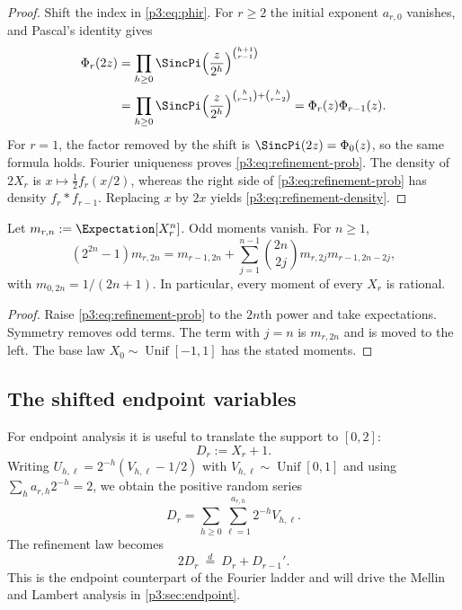 \documentclass[11pt,oneside]{article}
\theoremstyle{definition}
\theoremstyle{remark}
\begin{document}
\begin{proof}
Shift the index in \eqref{p3:eq:phir}.  For $r\ge2$ the initial exponent $a_{r,0}$ vanishes, and Pascal's identity gives
\begin{align*}
 \Phi_r(2z)
 &=\prod_{h\ge0}\SincPi\!\left(\frac z{2^h}\right)^{\binom{h+1}{r-1}}\\
 &=\prod_{h\ge0}\SincPi\!\left(\frac z{2^h}\right)^{\binom h{r-1}+\binom h{r-2}}
 =\Phi_r(z)\Phi_{r-1}(z).
\end{align*}
For $r=1$, the factor removed by the shift is $\SincPi(2z)=\Phi_0(z)$, so the same formula holds.  Fourier uniqueness proves \eqref{p3:eq:refinement-prob}.  The density of $2X_r$ is $x\mapsto \frac12 f_r(x/2)$, whereas the right side of \eqref{p3:eq:refinement-prob} has density $f_r*f_{r-1}$.  Replacing $x$ by $2x$ yields \eqref{p3:eq:refinement-density}.
\end{proof}

\begin{corollary}\label{p3:cor:moment-ladder}
Let $m_{r,n}:=\Expectation[X_r^n]$.  Odd moments vanish.  For $n\ge1$,
\begin{equation}\label{p3:eq:moment-ladder}
 (2^{2n}-1)m_{r,2n}
 =m_{r-1,2n}
 +\sum_{j=1}^{n-1}\binom{2n}{2j}m_{r,2j}m_{r-1,2n-2j},
\end{equation}
with $m_{0,2n}=1/(2n+1)$.  In particular, every moment of every $X_r$ is rational.
\end{corollary}

\begin{proof}
Raise \eqref{p3:eq:refinement-prob} to the $2n$th power and take expectations.  Symmetry removes odd terms.  The term with $j=n$ is $m_{r,2n}$ and is moved to the left.  The base law $X_0\sim\operatorname{Unif}[-1,1]$ has the stated moments.
\end{proof}

\subsection{The shifted endpoint variables}

For endpoint analysis it is useful to translate the support to $[0,2]$:
\begin{equation}\label{p3:eq:Dr}
  D_r:=X_r+1.
\end{equation}
Writing $U_{h,\ell}=2^{-h}(V_{h,\ell}-1/2)$ with $V_{h,\ell}\sim\operatorname{Unif}[0,1]$ and using $\sum_h a_{r,h}2^{-h}=2$, we obtain the positive random series
\begin{equation}\label{p3:eq:Dr-series}
  D_r=\sum_{h\ge0}\sum_{\ell=1}^{a_{r,h}}2^{-h}V_{h,\ell}.
\end{equation}
The refinement law becomes
\begin{equation}\label{p3:eq:Dr-refine}
  2D_r\ \stackrel d=\ D_r+D_{r-1}'.
\end{equation}
This is the endpoint counterpart of the Fourier ladder and will drive the Mellin and Lambert analysis in \cref{p3:sec:endpoint}.
\end{document}
